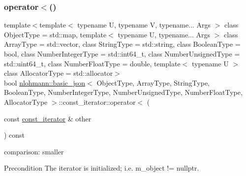\subsubsection{\texorpdfstring{operator$<$()}{operator<()}}
{\footnotesize\ttfamily template$<$template$<$ typename U, typename V, typename... Args $>$ class Object\+Type = std\+::map, template$<$ typename U, typename... Args $>$ class Array\+Type = std\+::vector, class String\+Type  = std\+::string, class Boolean\+Type  = bool, class Number\+Integer\+Type  = std\+::int64\+\_\+t, class Number\+Unsigned\+Type  = std\+::uint64\+\_\+t, class Number\+Float\+Type  = double, template$<$ typename U $>$ class Allocator\+Type = std\+::allocator$>$ \\
bool \hyperlink{classnlohmann_1_1basic__json}{nlohmann\+::basic\+\_\+json}$<$ Object\+Type, Array\+Type, String\+Type, Boolean\+Type, Number\+Integer\+Type, Number\+Unsigned\+Type, Number\+Float\+Type, Allocator\+Type $>$\+::const\+\_\+iterator\+::operator$<$ (\begin{DoxyParamCaption}\item[{const \hyperlink{classnlohmann_1_1basic__json_1_1const__iterator}{const\+\_\+iterator} \&}]{other }\end{DoxyParamCaption}) const\hspace{0.3cm}{\ttfamily [inline]}}



comparison\+: smaller 

\begin{DoxyPrecond}{Precondition}
The iterator is initialized; i.\+e. {\ttfamily m\+\_\+object != nullptr}. 
\end{DoxyPrecond}
\hypertarget{classnlohmann_1_1basic__json_1_1const__iterator_ab31ede5b25ad5e8a3bb06f6eadb50923}{}\label{classnlohmann_1_1basic__json_1_1const__iterator_ab31ede5b25ad5e8a3bb06f6eadb50923} 
